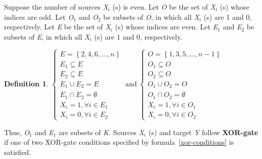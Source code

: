 \documentclass{article}
\numberwithin{equation}{section}
\numberwithin{figure}{section}
\numberwithin{table}{section}
\newtheorem{definition}[theorem]{Definition}
\begin{document}
Suppose the number of sources \textit{X${}_{i}$} (s) is even. Let \textit{O} be the set of \textit{X${}_{i}$} (s) whose indices are odd. Let \textit{O}${}_{1}$ and \textit{O}${}_{2}$ be subsets of \textit{O}, in which all \textit{X${}_{i}$} (s) are 1 and 0, respectively. Let \textit{E} be the set of \textit{X${}_{i}$} (s) whose indices are even. Let \textit{E}${}_{1}$ and \textit{E}${}_{2}$ be subsets of \textit{E}, in which all \textit{X${}_{i}$} (s) are 1 and 0, respectively.
\begin{definition}
$\left\{ \begin{array}{l}
E=\left\{2,4,6,\dots ,n\right\} \\ 
E_1\subseteq E \\ 
E_2\subseteq E \\ 
E_1\cup E_2=E \\ 
E_1\cap E_2=\emptyset  \\ 
X_i=1,\forall i\in E_1 \\ 
X_i=0,\forall i\in E_2 \end{array}
\right.\ \mathrm{and}\ \left\{ \begin{array}{l}
O=\left\{1,3,5,\dots ,n-1\right\} \\ 
O_1\subseteq O \\ 
O_2\subseteq O \\ 
O_1\cup O_2=O \\ 
O_1\cap O_2=\emptyset  \\ 
X_i=1,\forall i\in O_1 \\ 
X_i=0,\forall i\in O_2 \end{array}
\right.$
\label{definition:xor-subsets}
\end{definition}
Thus, \textit{O}${}_{1}$ and \textit{E}${}_{1}$ are subsets of \textit{K}. Sources \textit{X${}_{i}$} (s) and target \textit{Y} follow \textbf{XOR-gate} if one of two XOR-gate conditions specified by formula~\ref{xor-conditions} is satisfied.
\end{document}
